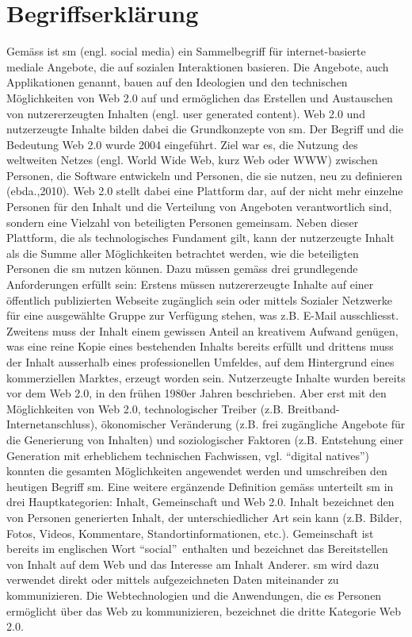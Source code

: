 \section{Begriffserklärung}\label{sec.begriff}
Gemäss  ist \gls{sm} (engl. social media) ein Sammelbegriff für internet-basierte mediale Angebote, die auf sozialen Interaktionen basieren. Die Angebote, auch Applikationen genannt, bauen auf den Ideologien und den technischen Möglichkeiten von Web 2.0 auf \cite{Kaplan:2010} und ermöglichen das Erstellen und Austauschen von nutzererzeugten Inhalten (engl. user generated content).\newline
Web 2.0 und nutzerzeugte Inhalte bilden dabei die Grundkonzepte von \gls{sm}. Der Begriff und die Bedeutung Web 2.0 wurde 2004 eingeführt. Ziel war es, die Nutzung des weltweiten Netzes (engl. World Wide Web, kurz Web oder WWW) zwischen Personen, die Software entwickeln und Personen, die sie nutzen, neu zu definieren (ebda.,2010). Web 2.0 stellt dabei eine Plattform dar, auf der nicht mehr einzelne Personen für den Inhalt und die Verteilung von Angeboten verantwortlich sind, sondern eine Vielzahl von beteiligten Personen gemeinsam. Neben dieser Plattform, die als technologisches Fundament gilt, kann der nutzerzeugte Inhalt als die Summe aller Möglichkeiten betrachtet werden, wie die beteiligten Personen die \gls{sm} nutzen können. Dazu müssen gemäss  drei grundlegende Anforderungen erfüllt sein: Erstens müssen nutzererzeugte Inhalte auf einer öffentlich publizierten Webseite zugänglich sein oder mittels Sozialer Netzwerke für eine ausgewählte Gruppe zur Verfügung stehen, was z.B. E-Mail ausschliesst. Zweitens muss der Inhalt einem gewissen Anteil an kreativem Aufwand genügen, was eine reine Kopie eines bestehenden Inhalts bereits erfüllt und drittens muss der Inhalt ausserhalb eines professionellen Umfeldes, auf dem Hintergrund eines kommerziellen Marktes, erzeugt worden sein. Nutzerzeugte Inhalte wurden bereits vor dem Web 2.0, in den frühen 1980er Jahren beschrieben. Aber erst mit den Möglichkeiten von Web 2.0, technologischer Treiber (z.B. Breitband-Internetanschluss), ökonomischer Veränderung (z.B. frei zugängliche Angebote für die Generierung von Inhalten) und soziologischer Faktoren (z.B. Entstehung einer Generation mit erheblichem technischen Fachwissen, vgl. \textquotedblleft digital natives\textquotedblright) konnten die gesamten Möglichkeiten angewendet werden und umschreiben den heutigen Begriff \gls{sm}.\newline 
Eine weitere ergänzende Definition gemäss  unterteilt \gls{sm} in drei Hauptkategorien: Inhalt, Gemeinschaft und Web 2.0. Inhalt bezeichnet den von Personen generierten Inhalt, der unterschiedlicher Art sein kann (z.B. Bilder, Fotos, Videos, Kommentare, Standortinformationen, etc.). Gemeinschaft ist bereits im englischen Wort \textquotedblleft social\textquotedblright \ enthalten und bezeichnet das Bereitstellen von Inhalt auf dem Web und das Interesse am Inhalt Anderer. \gls{sm} wird dazu verwendet direkt oder mittels aufgezeichneten Daten miteinander zu kommunizieren. Die Webtechnologien und die Anwendungen, die es Personen ermöglicht über das Web zu kommunizieren, bezeichnet die dritte Kategorie Web 2.0. \newline
